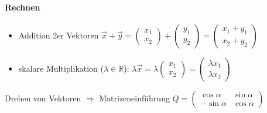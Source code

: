 \paragraph*{Rechnen}
\begin{itemize}
	\item Addition 2er Vektoren $\vec{x} + \vec{y} = \begin{pmatrix}x_1 \\ x_2\end{pmatrix} + \begin{pmatrix}y_1 \\ y_2\end{pmatrix} = \begin{pmatrix}x_1 + y_1 \\ x_2 + y_2\end{pmatrix}$
	\item skalare Multiplikation ($\lambda \in \mathbb{R}$): $\lambda \vec{x} = \lambda \begin{pmatrix}x_1 \\ x_2\end{pmatrix} = \begin{pmatrix}\lambda x_1 \\ \lambda x_2\end{pmatrix}$
\end{itemize}
\begin{note}
	Drehen von Vektoren $\Rightarrow$ Matrizeneinführung $Q = \begin{pmatrix}\cos \alpha & \sin \alpha \\ -\sin \alpha & \cos \alpha\end{pmatrix}$
\end{note}
